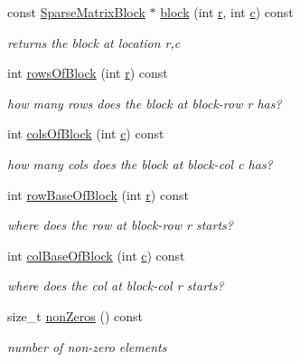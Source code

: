 \begin{DoxyCompactItemize}
const \hyperlink{classg2o_1_1SparseBlockMatrix_ab2f7376cbf055803fda6527dcc43e3be}{Sparse\+Matrix\+Block} $\ast$ \hyperlink{classg2o_1_1SparseBlockMatrix_a1dd47246358ea852f8ff3db76aa6a287}{block} (int \hyperlink{sparse__helper_8cpp_acab531abaa74a7e664e3986f2522b33a}{r}, int \hyperlink{sparse__helper_8cpp_a4e1e0e72dd773439e333c84dd762a9c3}{c}) const 
\begin{DoxyCompactList}\small\item\em returns the block at location r,c \end{DoxyCompactList}\item 
int \hyperlink{classg2o_1_1SparseBlockMatrix_a2f1eceae58978d7ee263a80961006d22}{rows\+Of\+Block} (int \hyperlink{sparse__helper_8cpp_acab531abaa74a7e664e3986f2522b33a}{r}) const 
\begin{DoxyCompactList}\small\item\em how many rows does the block at block-\/row r has? \end{DoxyCompactList}\item 
int \hyperlink{classg2o_1_1SparseBlockMatrix_adb88ef292aedf1468f57cf5dc751a8e2}{cols\+Of\+Block} (int \hyperlink{sparse__helper_8cpp_a4e1e0e72dd773439e333c84dd762a9c3}{c}) const 
\begin{DoxyCompactList}\small\item\em how many cols does the block at block-\/col c has? \end{DoxyCompactList}\item 
int \hyperlink{classg2o_1_1SparseBlockMatrix_a176a2dbe00711e248ea25dc1995c6b4c}{row\+Base\+Of\+Block} (int \hyperlink{sparse__helper_8cpp_acab531abaa74a7e664e3986f2522b33a}{r}) const 
\begin{DoxyCompactList}\small\item\em where does the row at block-\/row r starts? \end{DoxyCompactList}\item 
int \hyperlink{classg2o_1_1SparseBlockMatrix_adf282a20d7c77c5949a0d93ca2651271}{col\+Base\+Of\+Block} (int \hyperlink{sparse__helper_8cpp_a4e1e0e72dd773439e333c84dd762a9c3}{c}) const 
\begin{DoxyCompactList}\small\item\em where does the col at block-\/col r starts? \end{DoxyCompactList}\item 
size\+\_\+t \hyperlink{classg2o_1_1SparseBlockMatrix_a52c11b08907dbb80ac44ad5459bc70fe}{non\+Zeros} () const 
\begin{DoxyCompactList}\small\item\em number of non-\/zero elements \end{DoxyCompactList}\item 

\end{DoxyCompactItemize}
